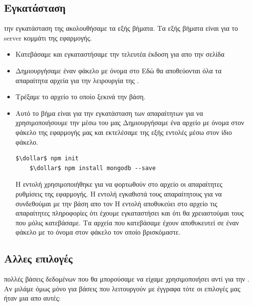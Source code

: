 \subsection*{Εγκατάσταση}
 την εγκατάσταση της  ακολουθήσαμε τα εξής βήματα.
Τα εξής βήματα είναι για το server κομμάτι της εφαρμογής.
\begin{itemize}
    \item Κατεβάσαμε και εγκαταστήσαμε την τελευτέα  έκδοση 
    για  απο την σελίδα 
    \item Δημιουργήσαμε έναν φάκελο με όνομα  στο  
    Εδώ θα αποθεύονται όλα τα απαραίτητα αρχεία για την λειρουργία της .
    \item Τρέξαμε το αρχείο  το οποίο ξεκινά την βάση.
    \item Αυτό το βήμα είναι για την εγκατάσταση των απαραίτητων  για να χρησιμοποιήσουμε την  μέσω του  μας Δημιουργήσαμε ένα αρχείο με όνομα  στον φάκελο της εφαρμογής μας και εκτελέσαμε της εξής εντολές μέσω  στον ίδιο φάκελο.
    \begin{lstlisting}[language=command.com]
    $\dollar$ npm init
    $\dollar$ npm install mongodb --save
    \end{lstlisting}
    Η εντολή  χρησιμοποιήθηκε για να φορτωθούν στο αρχείο  οι απαραίτητες ρυθμίσεις της εφαρμογής. 
    Η εντολή  εγκαθιστά τους απαραίτητους  για να συνδεθούμαι με την βάση απο τον  Η εντολή  αποθυκεύει στο αρχείο  τις απαραίτητες πληροφορίες ότι έχουμε εγκαταστήσει και ότι θα χρειαστούμαι τους  που μόλις κατεβάσαμε. Τα αρχεία που κατεβάσαμε έχουν αποθυκευτεί σε έναν φάκελο με το όνομα  στον φάκελο τον οποίο βρισκόμαστε.
\end{itemize}

\subsection*{Αλλες επιλογές}
 πολλές βάσεις δεδομένων που θα μπορούσαμε να είχαμε χρησιμοποιήσει αντί για την . Αν μιλάμε όμως μόνο για  βάσεις που λειτουργούν με έγγραφα τότε οι επιλογές μας ήταν μια απο αυτές: 

